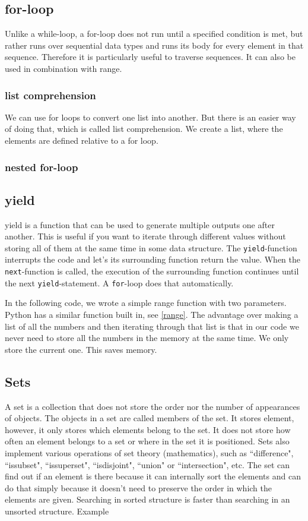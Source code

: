 \documentclass[10pt,a4paper]{article}
\begin{document}
\subsection{for-loop}
Unlike a while-loop, a for-loop does not run until a specified condition is met, but rather runs over sequential
data types and runs its body for every element in that sequence.  Therefore it is particularly useful to traverse
sequences.  It can also be used in combination with range.

\subsubsection{list comprehension}
\label{list_comprehension}
We can use for loops to convert one list into another. But there is an easier way of doing that, which is called list comprehension. We create a list, where the elements are defined relative to a for loop.

\subsubsection{nested for-loop}

\subsection{yield}
yield is a function that can be used to generate multiple outputs one after another. This is useful if you want to iterate through different values without storing all of them at the same time in some data structure. The \texttt{yield}-function interrupts the code and let's its surrounding function return the value. When the \texttt{next}-function is called, the execution of the surrounding function continues until the next \texttt{yield}-statement. A \texttt{for}-loop does that automatically.

In the following code, we wrote a simple range function with two parameters. Python has a similar function built in, see \ref{range}. The advantage over making a list of all the numbers and then iterating through that list is that in our code we never need to store all the numbers in the memory at the same time. We only store the current one. This saves memory.

\subsection{Sets}
A set is a collection that does not store the order nor the number of appearances of objects. The objects in a set are called members of the set.  It stores element, however, it only stores which elements belong to the set. It does not store how often an element belongs to a set or where in the set it is positioned. Sets also implement various operations of set theory (mathematics), such as ``difference", ``issubset", ``issuperset", ``isdisjoint", ``union" or ``intersection", etc. The set can find out if an element is there because it can internally sort the elements and can do that simply because it doesn't need to preserve the order in which the elements are given. Searching in sorted structure is faster than searching in an unsorted structure. Example

\end{document}
